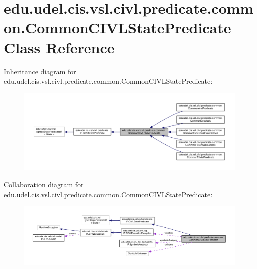 \hypertarget{classedu_1_1udel_1_1cis_1_1vsl_1_1civl_1_1predicate_1_1common_1_1CommonCIVLStatePredicate}{}\section{edu.\+udel.\+cis.\+vsl.\+civl.\+predicate.\+common.\+Common\+C\+I\+V\+L\+State\+Predicate Class Reference}
\label{classedu_1_1udel_1_1cis_1_1vsl_1_1civl_1_1predicate_1_1common_1_1CommonCIVLStatePredicate}


Inheritance diagram for edu.\+udel.\+cis.\+vsl.\+civl.\+predicate.\+common.\+Common\+C\+I\+V\+L\+State\+Predicate\+:
\nopagebreak
\begin{figure}[H]
\begin{center}
\leavevmode
\includegraphics[width=350pt]{classedu_1_1udel_1_1cis_1_1vsl_1_1civl_1_1predicate_1_1common_1_1CommonCIVLStatePredicate__inherit__graph}
\end{center}
\end{figure}


Collaboration diagram for edu.\+udel.\+cis.\+vsl.\+civl.\+predicate.\+common.\+Common\+C\+I\+V\+L\+State\+Predicate\+:
\nopagebreak
\begin{figure}[H]
\begin{center}
\leavevmode
\includegraphics[width=350pt]{classedu_1_1udel_1_1cis_1_1vsl_1_1civl_1_1predicate_1_1common_1_1CommonCIVLStatePredicate__coll__graph}
\end{center}
\end{figure}
